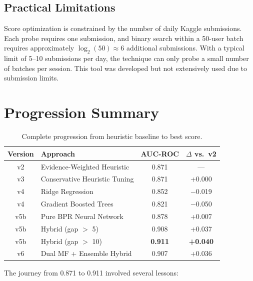 \documentclass[12pt]{article}
\begin{document}
\subsection{Practical Limitations}

Score optimization is constrained by the number of daily Kaggle submissions. Each probe requires one submission, and binary search within a 50-user batch requires approximately $\log_2(50) \approx 6$ additional submissions. With a typical limit of 5--10 submissions per day, the technique can only probe a small number of batches per session. This tool was developed but not extensively used due to submission limits.

\newpage
\section{Progression Summary}

\begin{table}[H]
	\centering
	\begin{tabular}{clcc}
		\toprule
		\textbf{Version} & \textbf{Approach} & \textbf{AUC-ROC} & \textbf{$\Delta$ vs.\ v2} \\
		\midrule
		v2  & Evidence-Weighted Heuristic        & 0.871  & ---     \\
		v3  & Conservative Heuristic Tuning      & 0.871  & +0.000  \\
		v4  & Ridge Regression                   & 0.852  & $-$0.019  \\
		v4  & Gradient Boosted Trees             & 0.821  & $-$0.050  \\
		v5b & Pure BPR Neural Network            & 0.878  & +0.007  \\
		v5b & Hybrid (gap $>$ 5)                 & 0.908  & +0.037  \\
		v5b & Hybrid (gap $>$ 10)                & \textbf{0.911}  & \textbf{+0.040}  \\
		v6  & Dual MF + Ensemble Hybrid          & 0.907  & +0.036  \\
		\bottomrule
	\end{tabular}
	\caption{Complete progression from heuristic baseline to best score.}\label{tab:progression}
\end{table}

The journey from 0.871 to 0.911 involved several lessons:
\end{document}
